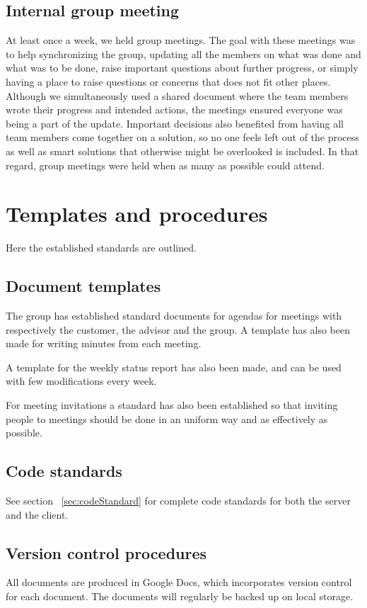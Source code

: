 \documentclass[11pt]{book}
\begin{document}
\subsection{Internal group meeting}
At least once a week, we held group meetings. The goal with these meetings was to help synchronizing the group, updating all the members on what was done and what was to be done, raise important questions about further progress, or simply having a place to raise questions or concerns that does not fit other places. Although we simultaneously used a shared document where the team members wrote their progress and intended actions, the meetings ensured everyone was being a part of the update. Important decisions also benefited from having all team members come together on a solution, so no one feels left out of the process as well as smart solutions that otherwise might be overlooked is included.  In that regard, group meetings were held when as many as possible could attend.

\section{Templates and procedures}
Here the established standards are outlined.

\subsection{Document templates}
The group has established standard documents for agendas for meetings with respectively the customer, the advisor and the group. A template has also been made for writing minutes from each meeting.

A template for the weekly status report has also been made, and can be used with few modifications every week.

For meeting invitations a standard has also been established so that inviting people to meetings should be done in an uniform way and as effectively as possible.

\subsection{Code standards}
See section ~\ref{sec:codeStandard} for complete code standards for both the server and the client.

\subsection{Version control procedures}
All documents are produced in Google Docs, which incorporates version control for each document. The documents will regularly be backed up on local storage.
\end{document}
